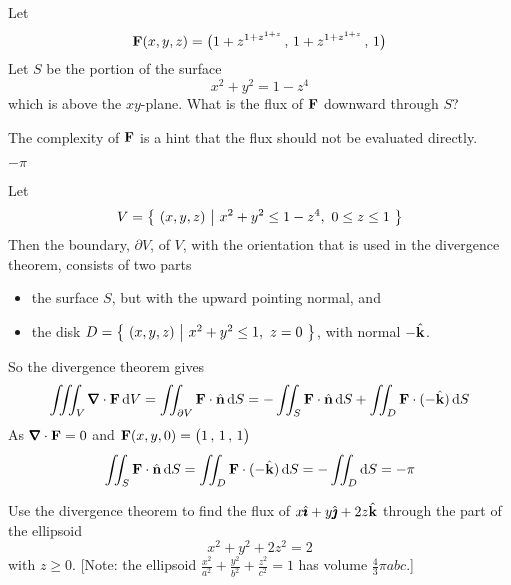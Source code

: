 \begin{question}[M317 2010D] %
Let
\begin{equation*}
\mathbf{F}(x, y, z) = \big( 1 + z^{1+z^{1+z}}\,,\, 1 + z^{1+z^{1+z}}\,,\,1\big)
\end{equation*} 
Let $S$ be the portion of the surface
\begin{equation*}
x^2 + y^2 = 1 - z^4
\end{equation*}
which is above the $xy$-plane. What is the flux of $\mathbf{F}$ downward through $S$?
\end{question}

\begin{hint} 
The complexity of $\mathbf{F}$ is a hint that the flux should
not be evaluated directly.
\end{hint}

\begin{answer} 
$-\pi$
\end{answer}

\begin{solution} Let
\begin{equation*}
V=\Set{(x,y,z)}{x^2+y^2\le 1-z^4,\ 0\le z\le 1}
\end{equation*}
Then the boundary, $\partial V$, of $V$, with the orientation
that is used in the divergence theorem, consists of two parts
\begin{itemize}
\item
the surface $S$, but with the upward pointing normal, and 
\item
the disk $D=\big\{ \ (x,y,z)\ \big|\ x^2+y^2\le 1,\ z=0\ \big\}$, with normal $-\hat{\mathbf{k}}$.
\end{itemize}
So the divergence theorem gives
\begin{align*}
\tripInt_V \vnabla\cdot\vF\,\dee{V}
=\dblInt_{\partial V}\vF\cdot\hn\,\dee{S}
=- \dblInt_S\vF\cdot\hn\,\dee{S}
  +\dblInt_D\vF\cdot(-\hk)\,\dee{S}
\end{align*}
As $\vnabla\cdot\vF=0$ and $\mathbf{F}(x,y,0) = \big( 1 \,,\, 1 \,,\,1\big)$
\begin{align*}
\iint_S\mathbf{F}\cdot\hat{\mathbf{n}}\,\mathrm{d}S
=\iint_D\mathbf{F}\cdot(-\hat{\mathbf{k}})\,\mathrm{d}S
=-\iint_D\mathrm{d}S
=-\pi
\end{align*}


\end{solution}

\begin{question}[M317 2002A] %
Use the divergence theorem to find the flux of $x\hat{\pmb{\imath}}+y\hat{\pmb{\jmath}}+2z\hat{\mathbf{k}}$
through the part of the ellipsoid 
$$
x^2+y^2+2z^2=2
$$
with $z\ge 0$. [Note: the ellipsoid $\frac{x^2}{a^2}+\frac{y^2}{b^2}+\frac{z^2}{c^2}=1$
has volume $\frac{4}{3}\pi abc$.]
\end{question}

